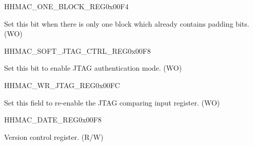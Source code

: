 \begin{register}{H}{HMAC\_ONE\_BLOCK\_REG}{0x00F4}\label{regdesc:HMACONEBLOCKREG}
%
%
\regnewline%
\begin{regdesc}\begin{reglist}
\label{fielddesc:HMACSETONEBLOCK}\item [HMAC\_SET\_ONE\_BLOCK] Set this bit when there is only one block which already contains padding bits. (WO)
\end{reglist}\end{regdesc}
\end{register}


\begin{register}{H}{HMAC\_SOFT\_JTAG\_CTRL\_REG}{0x00F8}\label{regdesc:HMACSOFTJTAGCTRLREG}
%
%
\regnewline%
\begin{regdesc}\begin{reglist}
\label{fielddesc:HMACSOFTJTAGCTRL}\item [HMAC\_SOFT\_JTAG\_CTRL] Set this bit to enable JTAG authentication mode. (WO)
\end{reglist}\end{regdesc}
\end{register}


\begin{register}{H}{HMAC\_WR\_JTAG\_REG}{0x00FC}\label{regdesc:HMACWRJTAGREG}
%
\regnewline%
\begin{regdesc}\begin{reglist}
\label{fielddesc:HMACWRJTAG}\item [HMAC\_WR\_JTAG] Set this field to re-enable the JTAG comparing input register. (WO)
\end{reglist}\end{regdesc}
\end{register}


\begin{register}{H}{HMAC\_DATE\_REG}{0x00F8}\label{regdesc:HMACDATEREG}
%
%
\regnewline%
\begin{regdesc}\begin{reglist}
\label{fielddesc:HMACDATE}\item [HMAC\_DATE] Version control register. (R/W)
\end{reglist}\end{regdesc}
\end{register}
